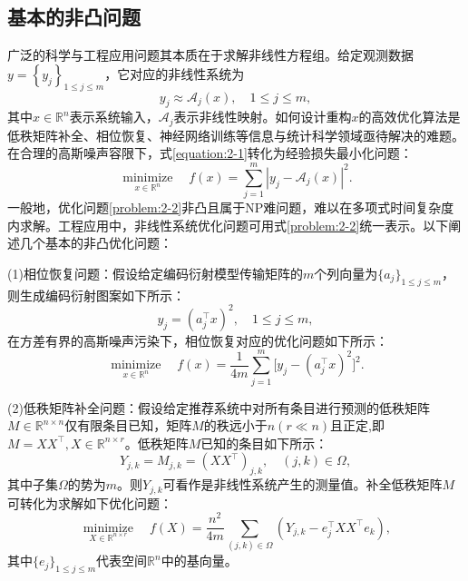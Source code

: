 \subsection{基本的非凸问题}
广泛的科学与工程应用问题其本质在于求解非线性方程组\supercite{Cong}。给定观测数据$y=\left\lbrace y_{j} \right\rbrace_{1\leq j\leq m}$，它对应的非线性系统为
\begin{equation} \label{equation:2-1}
	y_{j}\approx \mathcal{A}_{j}(x),\quad 1\leq j \leq m,
\end{equation}
其中$x\in\mathbb{R}^n$表示系统输入，$\mathcal{A}_{j}$表示非线性映射。如何设计重构$x$的高效优化算法是低秩矩阵补全、相位恢复、神经网络训练等信息与统计科学领域亟待解决的难题\supercite{PanShaohua,Ruoyu,Cong,Danilova}。在合理的高斯噪声容限下，式\eqref{equation:2-1}转化为经验损失最小化问题：
\begin{equation} \label{problem:2-2}
	\mathop{\text{minimize}}\limits_{x\in\mathbb{R}^n}\quad f(x)=\sum_{j=1}^{m}|y_{j}-\mathcal{A}_{j}(x)|^{2}.
\end{equation}
一般地，优化问题\eqref{problem:2-2}非凸且属于NP难问题，难以在多项式时间复杂度内求解。工程应用中，非线性系统优化问题可用式\eqref{problem:2-2}统一表示。以下阐述几个基本的非凸优化问题：

(1)相位恢复问题：假设给定编码衍射模型传输矩阵的$m$个列向量为$\{a_j\}_{1\leq j\leq m}$，则生成编码衍射图案如下所示：
\begin{equation} \label{equation:2-2}
	y_{j}=(a_{j}^\top x)^2,\quad 1\leq  j\leq m,
\end{equation}
在方差有界的高斯噪声污染下，相位恢复对应的优化问题如下所示：
\begin{equation}\label{problem:2-3}
	\mathop{\text{minimize}}\limits_{x\in\mathbb{R}^n}\quad f(x)= \frac{1}{4m}\sum_{j=1}^{m}\big[y_{j}-(a_{j}^\top x)^2\big]^2.
\end{equation}

(2)低秩矩阵补全问题：假设给定推荐系统中对所有条目进行预测的低秩矩阵$M\in\mathbb{R}^{n\times n}$仅有限条目已知，矩阵$M$的秩远小于$n(r\ll{n})$且正定,即$M=XX^\top,X\in\mathbb{R}^{n\times r}$。低秩矩阵$M$已知的条目如下所示：
\begin{equation} \label{equation:2-3}
	Y_{j,k}=M_{j,k}=(XX^\top)_{j,k},\quad (j,k)\in{\Omega},
\end{equation}
其中子集$\Omega$的势为$m$。则$Y_{j,k}$可看作是非线性系统产生的测量值。补全低秩矩阵$M$可转化为求解如下优化问题：
\begin{equation} \label{problem:2-4}
	\mathop{\text{minimize}}\limits_{X\in\mathbb{R}^{n\times r}}\quad f(X)= \frac{n^2}{4m}\sum_{(j,k)\in\Omega}\left( Y_{j,k}-e^\top_jXX^\top e_{k} \right),
\end{equation}
其中$\{e_j\}_{1\leq j\leq m}$代表空间$\mathbb{R}^n$中的基向量。

